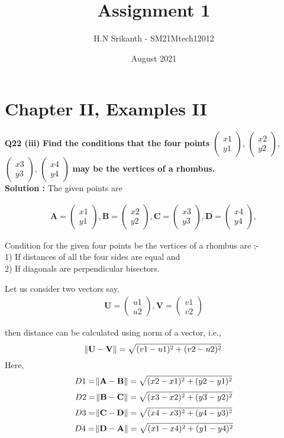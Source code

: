 \documentclass{article}
\title{\textbf{\Huge Assignment 1}}
\author{\large H.N Srikanth - SM21Mtech12012}
\date{August 2021}
\begin{document}
\providecommand{\mbf}{\mathbf}


\newcommand{\myvec}[1]{\ensuremath{\begin{pmatrix}#1\end{pmatrix}}}
\let\vec\mathbf


\maketitle

\section*{Chapter II, Examples II}
\textbf{Q22 (iii)}
\textbf{Find the conditions that the four points}
\myvec{x1\\y1}, \myvec{x2\\y2},
\myvec{x3\\y3}, \myvec{x4\\y4}
\textbf{ may be the vertices of a rhombus.}\\

\textbf{Solution :}
\vspace{0.2cm}
 The given points are


\begin{align*}
\vec{A} = \myvec{x1\\y1}, \vec{B} =\myvec{x2\\y2},
\vec{C} =\myvec{x3\\y3}, \vec{D} =\myvec{x4\\y4},
\end{align*}


Condition for the given four points be the vertices of a rhombus are ;-\\
1) If distances of all the four sides are equal and\\
2) If diagonals are perpendicular bisectors.

\vspace{0.2cm}

Let us consider two vectors say,
\begin{align*}
\vec{U} = \myvec{u1\\u2}, \vec{V} =\myvec{v1\\v2}
\end{align*} 


then distance can be calculated using norm of a vector, i.e., 
$$\norm{ \vec{U} - \vec{V}} = \sqrt{(v1-u1)^2+(v2-u2)^2}$$
Here, $$ D1=\norm{ \vec{A} - \vec{B}} =\sqrt{(x2-x1)^2+(y2-y1)^2}$$
$$ D2=\norm{ \vec{B} - \vec{C}} =\sqrt{(x3-x2)^2+(y3-y2)^2}$$
$$ D3=\norm{ \vec{C} - \vec{D}} =\sqrt{(x4-x3)^2+(y4-y3)^2}$$
$$ D4=\norm{ \vec{D} - \vec{A}} =\sqrt{(x1-x4)^2+(y1-y4)^2}$$
\end{document}
